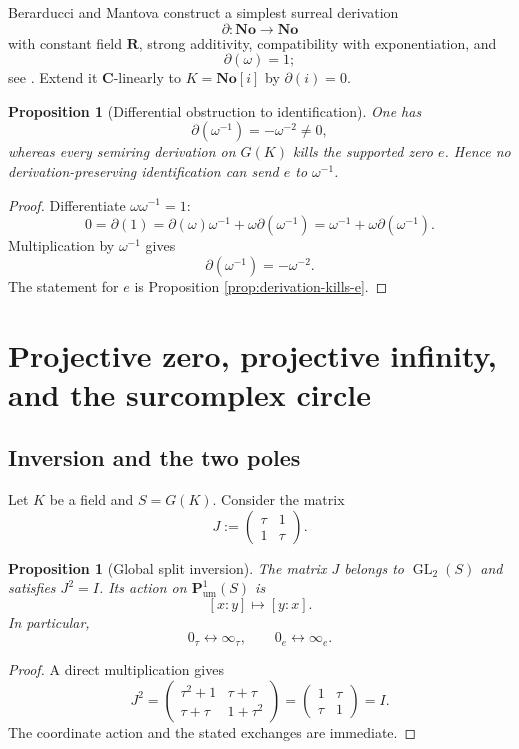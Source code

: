 \documentclass[11pt]{amsart}
\numberwithin{equation}{section}
\newtheorem{proposition}[theorem]{Proposition}
\theoremstyle{definition}
\newcommand{\R}{\mathbf R}
\newcommand{\C}{\mathbf C}
\newcommand{\No}{\mathbf{No}}
\newcommand{\GL}{\operatorname{GL}}
\newcommand{\Pum}{\mathbf P_{\mathrm{um}}}
\begin{document}
Berarducci and Mantova construct a simplest surreal derivation
\[
\partial:\No\longrightarrow\No
\]
with constant field $\R$, strong additivity, compatibility with exponentiation, and
\[
\partial(\omega)=1;
\]
see \cite{BerarducciMantova}.  Extend it $\C$-linearly to $K=\No[i]$ by $\partial(i)=0$.

\begin{proposition}[Differential obstruction to identification]\label{prop:differential-obstruction}
One has
\[
\partial(\omega^{-1})=-\omega^{-2}\neq0,
\]
whereas every semiring derivation on $G(K)$ kills the supported zero $e$.  Hence no derivation-preserving identification can send $e$ to $\omega^{-1}$.
\end{proposition}

\begin{proof}
Differentiate $\omega\omega^{-1}=1$:
\[
0
=
\partial(1)
=
\partial(\omega)\omega^{-1}
+
\omega\partial(\omega^{-1})
=
\omega^{-1}
+
\omega\partial(\omega^{-1}).
\]
Multiplication by $\omega^{-1}$ gives
\[
\partial(\omega^{-1})=-\omega^{-2}.
\]
The statement for $e$ is Proposition \ref{prop:derivation-kills-e}.
\end{proof}

\section{Projective zero, projective infinity, and the surcomplex circle}

\subsection{Inversion and the two poles}

Let $K$ be a field and $S=G(K)$.  Consider the matrix
\[
J:=
\begin{pmatrix}
\tau&1\\
1&\tau
\end{pmatrix}.
\]

\begin{proposition}[Global split inversion]\label{prop:global-inversion}
The matrix $J$ belongs to $\GL_2(S)$ and satisfies $J^2=I$.  Its action on $\Pum^1(S)$ is
\[
[x:y]\longmapsto[y:x].
\]
In particular,
\[
0_\tau\longleftrightarrow\infty_\tau,
\qquad
0_e\longleftrightarrow\infty_e.
\]
\end{proposition}

\begin{proof}
A direct multiplication gives
\[
J^2
=
\begin{pmatrix}
\tau^2+1&\tau+\tau\\
\tau+\tau&1+\tau^2
\end{pmatrix}
=
\begin{pmatrix}
1&\tau\\
\tau&1
\end{pmatrix}
=I.
\]
The coordinate action and the stated exchanges are immediate.
\end{proof}
\end{document}
